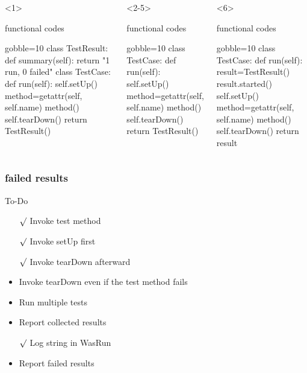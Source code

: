 \documentclass[lualatex]{beamer}
\begin{document}
\begin{frame}[fragile,t]
\begin{columns}[t]
    \begin{onlyenv}<1>
      \begin{block}{functional codes}
        \begin{pythoncode*}{gobble=10}
          class TestResult:
            def summary(self):
              return "1 run, 0 failed"
          class TestCase:
            def run(self):
              self.setUp()
              method=getattr(self, self.name)
              method()
              self.tearDown()
              return TestResult()
        \end{pythoncode*}
      \end{block}
    \end{onlyenv}
    \begin{onlyenv}<2-5>
      \begin{block}{functional codes}
        \begin{pythoncode*}{gobble=10}
          class TestCase:
            def run(self):
              self.setUp()
              method=getattr(self, self.name)
              method()
              self.tearDown()
              return TestResult()
        \end{pythoncode*}
      \end{block}
    \end{onlyenv}
    \begin{onlyenv}<6>
      \begin{block}{functional codes}
        \begin{pythoncode*}{gobble=10}
          class TestCase:
            def run(self):
              result=TestResult()
              result.started()
              self.setUp()
              method=getattr(self, self.name)
              method()
              self.tearDown()
              return result
        \end{pythoncode*}
      \end{block}
    \end{onlyenv}
  \end{columns}
\end{frame}

\begin{frame}
  \frametitle{failed results}

  \begin{block}{To-Do}
    \begin{itemize}
    \item[$\surd$] Invoke test method
    \item[$\surd$] Invoke setUp first 
    \item[$\surd$] Invoke tearDown afterward 
    \item Invoke tearDown even if the test method fails 
    \item Run multiple tests 
    \item Report collected results 
    \item[$\surd$] Log string in WasRun 
    \item Report failed results
    \end{itemize}
  \end{block}
\end{frame}
\end{document}
